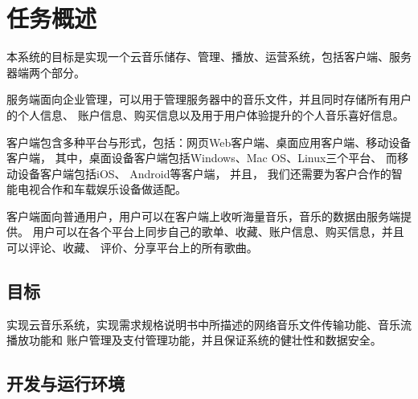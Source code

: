 
\chapter{任务概述}
本系统的目标是实现一个云音乐储存、管理、播放、运营系统，包括客户端、服务器端两个部分。

服务端面向企业管理，可以用于管理服务器中的音乐文件，并且同时存储所有用户的个人信息、
账户信息、购买信息以及用于用户体验提升的个人音乐喜好信息。

客户端包含多种平台与形式，包括：网页Web客户端、桌面应用客户端、移动设备客户端，
其中，桌面设备客户端包括Windows、Mac OS、Linux三个平台、 而移动设备客户端包括iOS、
Android等客户端， 并且， 我们还需要为客户合作的智能电视合作和车载娱乐设备做适配。

客户端面向普通用户，用户可以在客户端上收听海量音乐，音乐的数据由服务端提供。
用户可以在各个平台上同步自己的歌单、收藏、账户信息、购买信息，并且可以评论、收藏、
评价、分享平台上的所有歌曲。


\section{目标}
实现云音乐系统，实现需求规格说明书中所描述的网络音乐文件传输功能、音乐流播放功能和
账户管理及支付管理功能，并且保证系统的健壮性和数据安全。

\newpage
\section{开发与运行环境}

